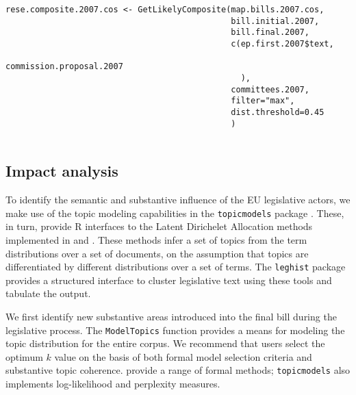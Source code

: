 \documentclass[11pt]{article}
\begin{document}
\begin{lstlisting}
rese.composite.2007.cos <- GetLikelyComposite(map.bills.2007.cos,
                                              bill.initial.2007,
                                              bill.final.2007,
                                              c(ep.first.2007$text,
                                                commission.proposal.2007
                                                ),
                                              committees.2007,
                                              filter="max",
                                              dist.threshold=0.45
                                              )
                       
\end{lstlisting}


\subsection{Impact analysis}
\label{sec:semant-impact-analys}

To identify the semantic and substantive influence of the EU
legislative actors, we make use of the topic modeling capabilities in the
\texttt{topicmodels} package \citep{grun2011topicmodels}. These, in
turn, provide R interfaces to the Latent Dirichelet Allocation methods
implemented in \cite{blei2003latent} and
\cite{blei2006correlated}. These methods infer a set of topics from
the term distributions over a set of documents, on the assumption that
topics are differentiated by different distributions over a set of
terms.  The \texttt{leghist} package
provides a structured interface to cluster legislative text using
these tools and tabulate the output.

We first identify new substantive areas introduced into the final bill
during the legislative process. The \texttt{ModelTopics} function
provides a means for modeling the topic distribution for the entire
corpus. We recommend that users select the optimum $k$ value on the basis of
both formal model selection criteria and substantive topic
coherence. \cite{wallach2009evaluation} provide a range of formal
methods; \texttt{topicmodels} also implements log-likelihood and
perplexity measures. 
\end{document}

